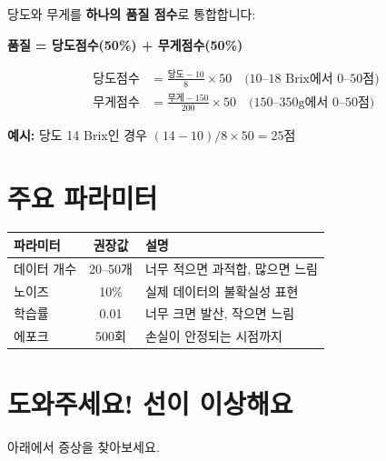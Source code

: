 \documentclass[11pt, a4paper]{article}
\begin{document}
당도와 무게를 \textbf{하나의 품질 점수}로 통합합니다:

\begin{tcolorbox}[colback=warmcream, colframe=bordercolor]
\begin{center}
\textbf{품질 = 당도점수(50\%) + 무게점수(50\%)}
\end{center}

\begin{align*}
\text{당도점수} &= \frac{\text{당도} - 10}{8} \times 50 \quad \text{(10--18 Brix에서 0--50점)} \\[0.3cm]
\text{무게점수} &= \frac{\text{무게} - 150}{200} \times 50 \quad \text{(150--350g에서 0--50점)}
\end{align*}

\textbf{예시:} 당도 14 Brix인 경우 $(14-10)/8 \times 50 = 25$점
\end{tcolorbox}

\section{주요 파라미터}

\begin{center}
\begin{tabular}{lcp{7cm}}
    \toprule
    \textbf{파라미터} & \textbf{권장값} & \textbf{설명} \\
    \midrule
    데이터 개수 & 20--50개 & 너무 적으면 과적합, 많으면 느림 \\
    노이즈 & 10\% & 실제 데이터의 불확실성 표현 \\
    학습률 & 0.01 & 너무 크면 발산, 작으면 느림 \\
    에포크 & 500회 & 손실이 안정되는 시점까지 \\
    \bottomrule
\end{tabular}
\end{center}

\section{도와주세요! 선이 이상해요}

\begin{warningbox}
아래에서 증상을 찾아보세요.
\end{warningbox}
\end{document}
